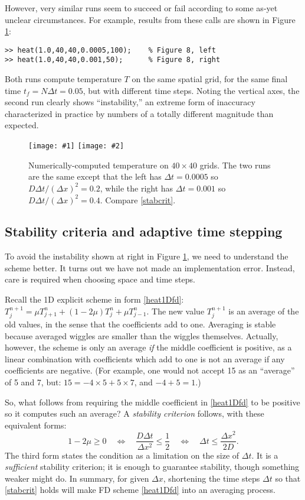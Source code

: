 \documentclass[letterpaper,final,12pt,reqno]{amsart}
\newcommand{\minput}[1]{
\vspace{0.8cm}
\VerbatimInput[frame=single,framesep=3mm,label=\fbox{\normalsize \textsl{\,#1.m\,}},fontfamily=courier,fontsize=\footnotesize]{tmp/#1.slim.m}
\vspace{0.5cm}
}
\newcommand{\twofigsizes}[5]{
\begin{figure}[ht]
\centering
\texttt{[image: \#1]} \quad
\texttt{[image: \#2]}
\caption{#3}
\label{fig:#1}
\end{figure}}
\newcommand{\twofig}[3]{\twofigsizes{#1}{#2}{#3}{2.5in}{2.5in}}
\begin{document}
\minput{heat}

However, very similar runs seem to succeed or fail according to some as-yet unclear circumstances.  For example, results from these calls are shown in Figure \ref{fig:stability}:
\begin{Verbatim}
>> heat(1.0,40,40,0.0005,100);    % Figure 8, left
>> heat(1.0,40,40,0.001,50);      % Figure 8, right
\end{Verbatim}
Both runs compute temperature $T$ on the same spatial grid, for the same final time $t_f = N \Delta t = 0.05$, but with different time steps.  Noting the vertical axes, the second run clearly shows ``instability,'' an extreme form of inaccuracy characterized in practice by numbers of a totally different magnitude than expected.

\twofig{stability}{instability}{Numerically-computed temperature on $40\times 40$ grids.  The two runs are the same except that the left has $\Delta t=0.0005$ so $D\Delta t/(\Delta x)^2= 0.2$, while the right has $\Delta t=0.001$ so $D\Delta t/(\Delta x)^2= 0.4$.  Compare \eqref{stabcrit}.}

\subsection*{Stability criteria and adaptive time stepping}  To avoid the instability shown at right in Figure \ref{fig:stability}, we need to understand the scheme better.  It turns out we have not made an implementation error.  Instead, care is required when choosing space and time steps.

Recall the 1D explicit scheme in form \eqref{heat1Dfd}: $T_j^{n+1} = \mu T_{j+1}^n + (1 - 2 \mu) T_j^n + \mu T_{j-1}^n$.  The new value $T_j^{n+1}$ is an average of the old values, in the sense that the coefficients add to one.  Averaging is stable because averaged wiggles are smaller than the wiggles themselves.  Actually, however, the scheme is only an average \emph{if} the middle coefficient is positive, as a linear combination with coefficients which add to one is not an average if any coefficients are negative.  (For example, one would not accept 15 as an ``average'' of 5 and 7, but: $15 = -4 \times 5 + 5 \times 7$, and $-4+5=1$.)

So, what follows from requiring the middle coefficient in \eqref{heat1Dfd} to be positive so it computes such an average?  A \emph{stability criterion} follows, with these equivalent forms:
\begin{equation}
   1 - 2 \mu \ge 0 \quad \iff \quad \frac{D\Delta t}{\Delta x^2} \le \frac{1}{2} \quad \iff \quad \Delta t \le \frac{\Delta x^2}{2 D}.  \label{stabcrit}
\end{equation}
The third form states the condition as a limitation on the size of $\Delta t$.  It is a \emph{sufficient} stability criterion; it is enough to guarantee stability, though something weaker might do.  In summary, for given $\Delta x$, shortening the time steps $\Delta t$ so that \eqref{stabcrit} holds will make FD scheme \eqref{heat1Dfd} into an averaging process.
\end{document}
